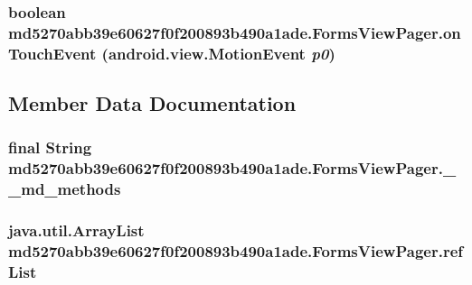 \hypertarget{classmd5270abb39e60627f0f200893b490a1ade_1_1_forms_view_pager_48682b3406ea863f47698921ff4bb49e}{
\subsubsection[{onTouchEvent}]{\setlength{\rightskip}{0pt plus 5cm}boolean md5270abb39e60627f0f200893b490a1ade.FormsViewPager.onTouchEvent (android.view.MotionEvent {\em p0})}}
\label{classmd5270abb39e60627f0f200893b490a1ade_1_1_forms_view_pager_48682b3406ea863f47698921ff4bb49e}




\subsection{Member Data Documentation}
\hypertarget{classmd5270abb39e60627f0f200893b490a1ade_1_1_forms_view_pager_0afe4852089db54f50fdcd4673a3538f}{
\subsubsection[{\_\-\_\-md\_\-methods}]{\setlength{\rightskip}{0pt plus 5cm}final String {\bf md5270abb39e60627f0f200893b490a1ade.FormsViewPager.\_\-\_\-md\_\-methods}}}
\label{classmd5270abb39e60627f0f200893b490a1ade_1_1_forms_view_pager_0afe4852089db54f50fdcd4673a3538f}


\hypertarget{classmd5270abb39e60627f0f200893b490a1ade_1_1_forms_view_pager_5a614138d55f15c99829c6d967ad7a1d}{
\subsubsection[{refList}]{\setlength{\rightskip}{0pt plus 5cm}java.util.ArrayList {\bf md5270abb39e60627f0f200893b490a1ade.FormsViewPager.refList}}}
\label{classmd5270abb39e60627f0f200893b490a1ade_1_1_forms_view_pager_5a614138d55f15c99829c6d967ad7a1d}




